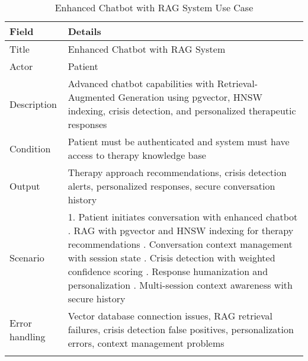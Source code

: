 \begin{longtable}{|p{3cm}|p{12cm}|}
\hline
\textbf{Field} & \textbf{Details} \\
\hline
Title & Enhanced Chatbot with RAG System \\
\hline
Actor & Patient \\
\hline
Description & Advanced chatbot capabilities with Retrieval-Augmented Generation using pgvector, HNSW indexing, crisis detection, and personalized therapeutic responses \\
\hline
Condition & Patient must be authenticated and system must have access to therapy knowledge base \\
\hline
Output & Therapy approach recommendations, crisis detection alerts, personalized responses, secure conversation history \\
\hline
Scenario & 1. Patient initiates conversation with enhanced chatbot \newline 2. RAG with pgvector and HNSW indexing for therapy recommendations \newline 3. Conversation context management with session state \newline 4. Crisis detection with weighted confidence scoring \newline 5. Response humanization and personalization \newline 6. Multi-session context awareness with secure history \\
\hline
Error handling & Vector database connection issues, RAG retrieval failures, crisis detection false positives, personalization errors, context management problems \\
\hline
\caption{Enhanced Chatbot with RAG System Use Case}
\end{longtable}

